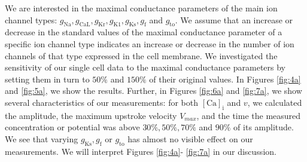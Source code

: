 \documentclass{article}
\begin{document}
We are interested in the maximal conductance parameters of the main ion channel types: $g_{\mathrm{Na}}, g_{\mathrm{CaL}}, g_{\mathrm{Kr}}, g_{\mathrm{K1}}, g_{\mathrm{Ks}}, g_{\mathrm{f}}$ and $g_{\mathrm{to}}$. We assume that an increase or decrease in the standard values of the maximal conductance parameter of a specific ion channel type indicates an increase or decrease in the number of ion channels of that type expressed in the cell membrane. We investigated the sensitivity of our single cell data to the maximal conductance parameters by setting them in turn to $50\%$ and $150\%$ of their original values. In Figures \ref{fig:4a} and \ref{fig:5a}, we show the results. Further, in Figures \ref{fig:6a} and \ref{fig:7a}, we show several characteristics of our measurements: for both $[\mathrm{Ca}]_{\mathrm{i}}$ and $v$, we calculated the amplitude, the maximum upstroke velocity $V_{max}$, and the time the measured concentration or potential was above $30\%, 50\%, 70\%$ and $90\%$ of its amplitude. We see that varying $g_{\mathrm{Ks}}, g_{\mathrm{f}}$ or $g_{\mathrm{to}}$ has almost no visible effect on our measurements.
%
We will interpret Figures \ref{fig:4a}- \ref{fig:7a} in our discussion.
\end{document}
